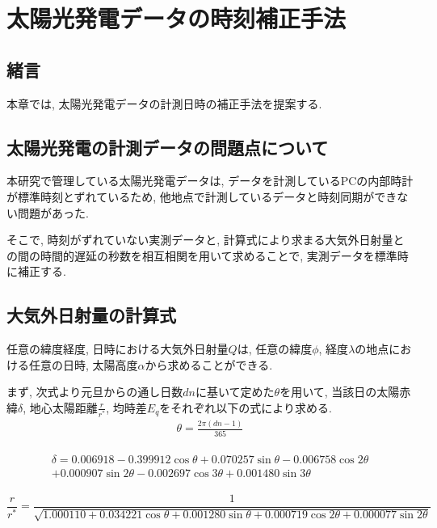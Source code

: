 
\chapter{太陽光発電データの時刻補正手法}
\label{chap:second}

\section{緒言}
本章では, 太陽光発電データの計測日時の補正手法を提案する.


\section{太陽光発電の計測データの問題点について}
本研究で管理している太陽光発電データは, データを計測しているPCの内部時計が標準時刻とずれているため, 他地点で計測しているデータと時刻同期ができない問題があった. 

そこで, 時刻がずれていない実測データと, 計算式により求まる大気外日射量との間の時間的遅延の秒数を相互相関を用いて求めることで, 実測データを標準時に補正する.

\section{大気外日射量の計算式}
任意の緯度経度, 日時における大気外日射量$Q$は, 任意の緯度$\phi$, 経度$\lambda$の地点における任意の日時, 太陽高度$\alpha$から求めることができる.

まず, 次式より元旦からの通し日数$dn$に基いて定めた$\theta$を用いて, 当該日の太陽赤緯$\delta$, 地心太陽距離$\frac{r}{r^{*}}$, 均時差$E_q$をそれぞれ以下の式により求める.
\begin{eqnarray}
  \theta =  \frac{2\pi (dn-1)}{365}
\end{eqnarray}

\begin{eqnarray}
  \begin{split}
    \delta =  0.006918-0.399912\cos \theta+0.070257\sin \theta-0.006758\cos 2\theta\\
    +0.000907\sin 2\theta-0.002697\cos 3\theta+0.001480\sin 3\theta
  \end{split}
\end{eqnarray}

\begin{dmath}
  \frac{r}{r^{*}} =  \frac{1}{\sqrt{1.000110+0.034221\cos \theta+0.001280\sin \theta+0.000719\cos 2\theta+0.000077\sin 2\theta}}
\end{dmath}

